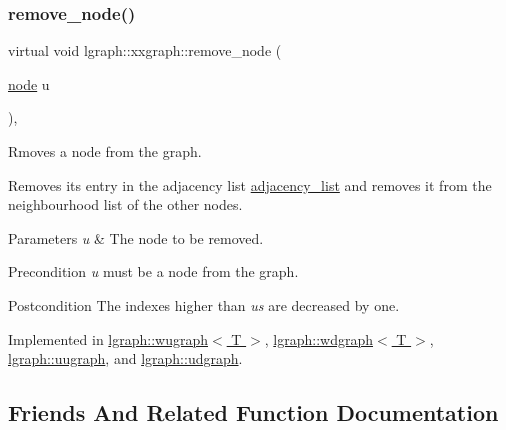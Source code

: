 \subsubsection{\texorpdfstring{remove\+\_\+node()}{remove\_node()}}
{\footnotesize\ttfamily virtual void lgraph\+::xxgraph\+::remove\+\_\+node (\begin{DoxyParamCaption}\item[{\hyperlink{namespacelgraph_a397169dd66adf725210a30fb7251773e}{node}}]{u }\end{DoxyParamCaption})\hspace{0.3cm}{\ttfamily [pure virtual]}, {\ttfamily [inherited]}}



Rmoves a node from the graph. 

Removes its entry in the adjacency list \hyperlink{classlgraph_1_1xxgraph_a31cf82d0b20be05290be259dc97a51ec}{adjacency\+\_\+list} and removes it from the neighbourhood list of the other nodes.


\begin{DoxyParams}{Parameters}
{\em u} & The node to be removed. \\
\hline
\end{DoxyParams}
\begin{DoxyPrecond}{Precondition}
{\itshape u} must be a node from the graph. 
\end{DoxyPrecond}
\begin{DoxyPostcond}{Postcondition}
The indexes higher than {\itshape u\textquotesingle{}s} are decreased by one. 
\end{DoxyPostcond}


Implemented in \hyperlink{classlgraph_1_1wugraph_ad8eff47efc751e7bc5aa10b79ff70633}{lgraph\+::wugraph$<$ T $>$}, \hyperlink{classlgraph_1_1wdgraph_aa6861b63fccd1def268f3ff84d31da52}{lgraph\+::wdgraph$<$ T $>$}, \hyperlink{classlgraph_1_1uugraph_aa7f32c48d008edaa4992eb72a176e806}{lgraph\+::uugraph}, and \hyperlink{classlgraph_1_1udgraph_a043aab345008c5eedb4cf429f85e99df}{lgraph\+::udgraph}.



\subsection{Friends And Related Function Documentation}
\mbox{\label{classlgraph_1_1uxgraph_a74a84e077ff7034900deea3a89653d6c}} 
